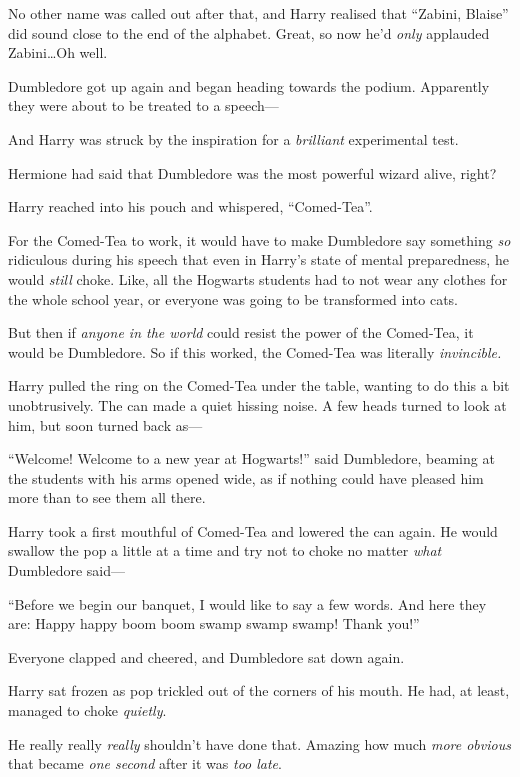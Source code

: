 No other name was called out after that, and Harry realised that “Zabini, Blaise” did sound close to the end of the alphabet. Great, so now he’d \emph{only} applauded Zabini…Oh well.

Dumbledore got up again and began heading towards the podium. Apparently they were about to be treated to a speech—

And Harry was struck by the inspiration for a \emph{brilliant} experimental test.

Hermione had said that Dumbledore was the most powerful wizard alive, right?

Harry reached into his pouch and whispered, “Comed-Tea”.

For the Comed-Tea to work, it would have to make Dumbledore say something \emph{so} ridiculous during his speech that even in Harry’s state of mental preparedness, he would \emph{still} choke. Like, all the Hogwarts students had to not wear any clothes for the whole school year, or everyone was going to be transformed into cats.

But then if \emph{anyone in the world} could resist the power of the Comed-Tea, it would be Dumbledore. So if this worked, the Comed-Tea was literally \emph{invincible.}

Harry pulled the ring on the Comed-Tea under the table, wanting to do this a bit unobtrusively. The can made a quiet hissing noise. A few heads turned to look at him, but soon turned back as—

“Welcome! Welcome to a new year at Hogwarts!” said Dumbledore, beaming at the students with his arms opened wide, as if nothing could have pleased him more than to see them all there.

Harry took a first mouthful of Comed-Tea and lowered the can again. He would swallow the pop a little at a time and try not to choke no matter \emph{what} Dumbledore said—

“Before we begin our banquet, I would like to say a few words. And here they are: Happy happy boom boom swamp swamp swamp! Thank you!”

Everyone clapped and cheered, and Dumbledore sat down again.

Harry sat frozen as pop trickled out of the corners of his mouth. He had, at least, managed to choke \emph{quietly}.

He really really \emph{really} shouldn’t have done that. Amazing how much \emph{more obvious} that became \emph{one second} after it was \emph{too late}.

